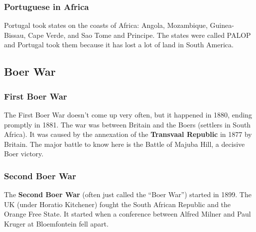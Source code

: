 \subsubsection*{Portuguese in Africa}

Portugal took states on the coasts of Africa:
Angola,
Mozambique,
Guinea-Bissau,
Cape Verde,
and Sao Tome and Principe.
The states were called PALOP and Portugal took them because it has lost a lot of land in South America.

\subsection*{Boer War}

\subsubsection*{First Boer War}

The First Boer War doesn't come up very often, but it happened in 1880, ending promptly in 1881.
The war was between Britain and the Boers (settlers in South Africa).
It was caused by the annexation of the \textbf{Transvaal Republic} in 1877 by Britain.
The major battle to know here is the Battle of Majuba Hill, a decisive Boer victory.

\subsubsection*{Second Boer War}

The \textbf{Second Boer War} (often just called the ``Boer War'') started in 1899.
The UK (under Horatio Kitchener) fought the South African Republic and the Orange Free State.
It started when a conference between Alfred Milner and Paul Kruger at Bloemfontein fell apart.
